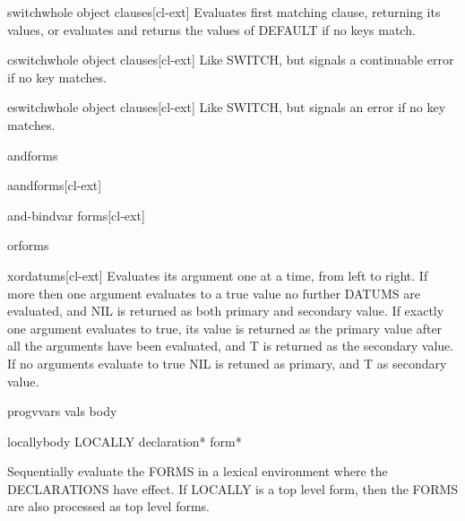 \documentclass[10pt,english]{book}
\begin{document}
\begin{macro}{switch}{\whole whole object \body clauses}[cl-ext]
  Evaluates first matching clause, returning its values, or evaluates and
returns the values of DEFAULT if no keys match.
\end{macro}

\begin{macro}{cswitch}{\whole whole object \body clauses}[cl-ext]
  Like SWITCH, but signals a continuable error if no key matches.
\end{macro}

\begin{macro}{eswitch}{\whole whole object \body clauses}[cl-ext]
  Like SWITCH, but signals an error if no key matches.
\end{macro}

\begin{macro}{and}{\rest forms}
  
\end{macro}

\begin{macro}{aand}{\rest forms}[cl-ext]
  
\end{macro}

\begin{macro}{and-bind}{var \rest forms}[cl-ext]
  
\end{macro}

\begin{macro}{or}{\rest forms}
  
\end{macro}

\begin{macro}{xor}{\rest datums}[cl-ext]
  Evaluates its argument one at a time, from left to right. If more then one
argument evaluates to a true value no further DATUMS are evaluated, and NIL is
returned as both primary and secondary value. If exactly one argument
evaluates to true, its value is returned as the primary value after all the
arguments have been evaluated, and T is returned as the secondary value. If no
arguments evaluate to true NIL is retuned as primary, and T as secondary
value.
\end{macro}

\begin{specialop}{progv}{vars vals \body body}
  
\end{specialop}

\begin{specialop}{locally}{\body body}
  LOCALLY declaration* form*

Sequentially evaluate the FORMS in a lexical environment where the
DECLARATIONS have effect. If LOCALLY is a top level form, then the FORMS are
also processed as top level forms.
\end{specialop}
\end{document}
